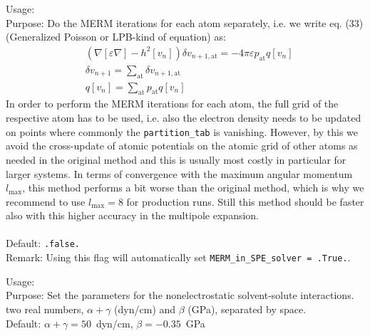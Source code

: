 {
  \noindent
  Usage:   \\[1.0ex]
  Purpose: Do the MERM iterations for each atom separately, i.e. we write eq. (33)\cite{Ringe2016} (Generalized Poisson or LPB-kind of equation) as:\\
  \begin{align}
          &\left(\nabla \left[\varepsilon \nabla\right] - h^2[v_{n}]\right) \delta v_{n+1,\mathrm{at}} = -4 \pi \varepsilon p_\mathrm{at} q[v_n]\\
          &\delta v_{n+1} = \sum_\mathrm{at} \delta v_{n+1,\mathrm{at}}\\
          &q[v_n] = \sum_\mathrm{at} p_\mathrm{at} q[v_n]
  \end{align}
  In order to perform the MERM iterations for each atom, the full grid of the respective atom has to be used, i.e. also the electron density needs to be updated on points where commonly the \texttt{partition\_tab} is vanishing. However, by this we avoid the cross-update of atomic potentials on the atomic grid of other atoms as needed in the original method and this is usually most costly in particular for larger systems. In terms of convergence with the maximum angular momentum $l_\mathrm{max}$, this method performs a bit worse than the original method, which is why we recommend to use $l_\mathrm{max}=8$ for production runs. Still this method should be faster also with this higher accuracy in the multipole expansion. \\[1.0ex]
   \\[1.0ex]
  Default: \texttt{.false.} \\[1.0ex]
  Remark: Using this flag will automatically set \texttt{MERM\_in\_SPE\_solver = .True.}.
}

{
  \noindent
  Usage:    \\[1.0ex]
  Purpose: Set the parameters for the nonelectrostatic solvent-solute interactions. \\[1.0ex]
   two real numbers, $\alpha+\gamma$ (dyn/cm) and $\beta$ (GPa), separated by space. \\[1.0ex]
  Default: $\alpha+\gamma = 50$~dyn/cm, $\beta = -0.35$~GPa
}





